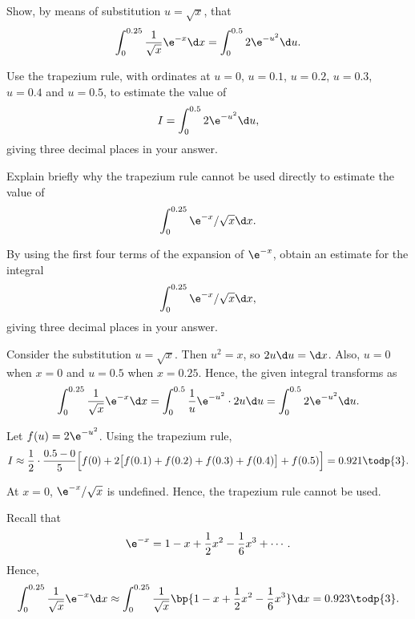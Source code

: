 \begin{problem}
    Show, by means of substitution $u = \sqrt{x}$, that \[\int_0^{0.25} \frac1{\sqrt{x}} \e^{-x} \d x = \int_0^{0.5} 2\e^{-u^2} \d u.\]

    Use the trapezium rule, with ordinates at $u = 0$, $u = 0.1$, $u = 0.2$, $u = 0.3$, $u = 0.4$ and $u = 0.5$, to estimate the value of \[I = \int_0^{0.5} 2\e^{-u^2} \d u,\] giving three decimal places in your answer.

    Explain briefly why the trapezium rule cannot be used directly to estimate the value of \[\int_0^{0.25} \e^{-x}/\sqrt{x} \d x.\]

    By using the first four terms of the expansion of $\e^{-x}$, obtain an estimate for the integral \[\int_0^{0.25} \e^{-x}/\sqrt{x} \d x,\] giving three decimal places in your answer.
\end{problem}
\begin{solution}
    Consider the substitution $u = \sqrt{x}$. Then $u^2 = x$, so $2u \d u = \d x$. Also, $u = 0$ when $x = 0$ and $u = 0.5$ when $x = 0.25$. Hence, the given integral transforms as \[\int_0^{0.25} \frac1{\sqrt{x}} \e^{-x} \d x = \int_{0}^{0.5} \frac1u \e^{-u^2} \cdot 2u \d u = \int_0^{0.5} 2\e^{-u^2} \d u.\]

    Let $f(u) = 2\e^{-u^2}$. Using the trapezium rule, \[I \approx \frac12 \cdot \frac{0.5 - 0}{5} \Big[f(0) + 2\big[f(0.1) + f(0.2) + f(0.3) + f(0.4)\big] + f(0.5) \Big] = 0.921 \todp{3}.\]

    At $x = 0$, $\e^{-x}/\sqrt{x}$ is undefined. Hence, the trapezium rule cannot be used.

    Recall that \[\e^{-x} = 1 - x + \frac12 x^2 - \frac16 x^3 + \cdots.\] Hence, \[\int_0^{0.25} \frac1{\sqrt{x}} \e^{-x} \d x \approx \int_0^{0.25} \frac1{\sqrt x}\bp{1 - x + \frac12 x^2 - \frac16 x^3} \d x = 0.923 \todp{3}.\]
\end{solution}

